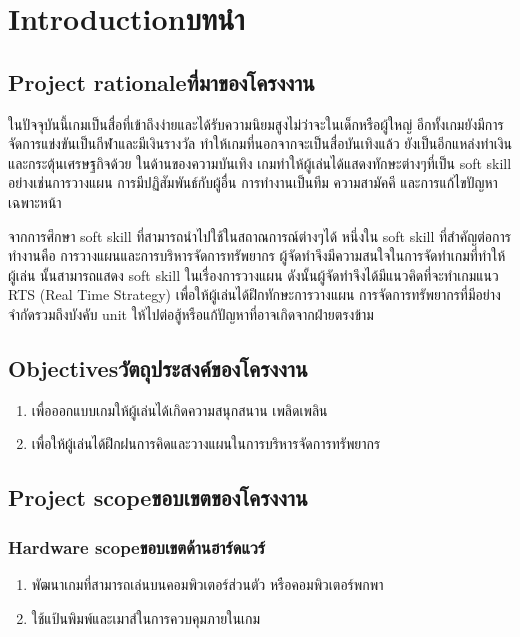 \chapter{\ifenglish Introduction\else บทนำ\fi}

\section{\ifenglish Project rationale\else ที่มาของโครงงาน\fi}

\qquad ในปัจจุบันนี้เกมเป็นสื่อที่เข้าถึงง่ายและได้รับความนิยมสูงไม่ว่าจะในเด็กหรือผู้ใหญ่ อีกทั้งเกมยังมีการจัดการแข่งขันเป็นกีฬาและมีเงินรางวัล ทําให้เกมที่นอกจากจะเป็นสื่อบันเทิงแล้ว 
ยังเป็นอีกแหล่งทําเงินและกระตุ้นเศรษฐกิจด้วย ในด้านของความบันเทิง เกมทําให้ผู้เล่นได้แสดงทักษะต่างๆที่เป็น soft
skill อย่างเช่นการวางแผน การมีปฏิสัมพันธ์กับผู้อื่น การทํางานเป็นทีม ความสามัคคี และการแก้ไขปัญหาเฉพาะหน้า

\enskip จากการศึกษา soft skill ที่สามารถนําไปใช้ในสถาณการณ์ต่างๆได้ หนึ่งใน soft skill ที่สําคัญต่อการทํางานคือ การวางแผนและการบริหารจัดการทรัพยากร ผู้จัดทําจึงมีความสนใจในการจัดทําเกมที่ทําให้ผู้เล่น
นั้นสามารถแสดง soft skill ในเรื่องการวางแผน ดังนั้นผู้จัดทําจึงได้มีแนวคิดที่จะทําเกมแนว RTS (Real Time Strategy) เพื่อให้ผู้เล่นได้ฝึกทักษะการวางแผน การจัดการทรัพยากรที่มีอย่างจํากัดรวมถึงบังคับ unit 
ให้ไปต่อสู้หรือแก้ปัญหาที่อาจเกิดจากฝ่ายตรงข้าม
\section{\ifenglish Objectives\else วัตถุประสงค์ของโครงงาน\fi}
\begin{enumerate}
    \item เพื่อออกแบบเกมให้ผู้เล่นได้เกิดความสนุกสนาน เพลิดเพลิน
    \item เพื่อให้ผู้เล่นได้ฝึกฝนการคิดและวางแผนในการบริหารจัดการทรัพยากร
\end{enumerate}

\section{\ifenglish Project scope\else ขอบเขตของโครงงาน\fi}

\subsection{\ifenglish Hardware scope\else ขอบเขตด้านฮาร์ดแวร์\fi}
\begin{enumerate}
    \item พัฒนาเกมที่สามารถเล่นบนคอมพิวเตอร์ส่วนตัว หรือคอมพิวเตอร์พกพา
    \item ใช้แป้นพิมพ์และเมาส์ในการควบคุมภายในเกม
\end{enumerate}
